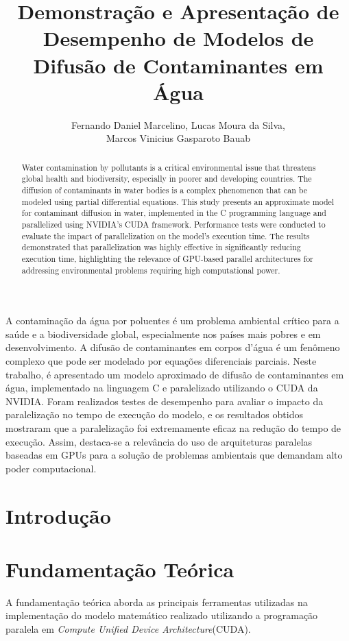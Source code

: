 \documentclass[12pt]{article}
\title{Demonstração e Apresentação de Desempenho de Modelos de Difusão de Contaminantes em Água}
\author{Fernando Daniel Marcelino\inst{1}, Lucas Moura da Silva\inst{1},\\ Marcos Vinicius Gasparoto Bauab\inst{1} }
\begin{document}
 

\maketitle

\begin{abstract}
Water contamination by pollutants is a critical environmental issue that threatens global health and biodiversity, especially in poorer and developing countries. The diffusion of contaminants in water bodies is a complex phenomenon that can be modeled using partial differential equations. This study presents an approximate model for contaminant diffusion in water, implemented in the C programming language and parallelized using NVIDIA's CUDA framework. Performance tests were conducted to evaluate the impact of parallelization on the model's execution time. The results demonstrated that parallelization was highly effective in significantly reducing execution time, highlighting the relevance of GPU-based parallel architectures for addressing environmental problems requiring high computational power.
\end{abstract}
     
\begin{resumo} 
A contaminação da água por poluentes é um problema ambiental crítico para a saúde e a biodiversidade global, especialmente nos países mais pobres e em desenvolvimento. A difusão de contaminantes em corpos d'água é um fenômeno complexo que pode ser modelado por equações diferenciais parciais. Neste trabalho, é apresentado um modelo aproximado de difusão de contaminantes em água, implementado na linguagem C e paralelizado utilizando o CUDA da NVIDIA. Foram realizados testes de desempenho para avaliar o impacto da paralelização no tempo de execução do modelo, e os resultados obtidos mostraram que a paralelização foi extremamente eficaz na redução do tempo de execução. Assim, destaca-se a relevância do uso de arquiteturas paralelas baseadas em GPUs para a solução de problemas ambientais que demandam alto poder computacional.
\end{resumo}

\section{Introdução} \label{sec:introducao}


\section{Fundamentação Teórica} \label{sec:fundaTeorica}
A fundamentação teórica aborda as principais ferramentas utilizadas na implementação do modelo matemático realizado utilizando a programação paralela em \emph{Compute Unified Device Architecture}(CUDA).
\end{document}
